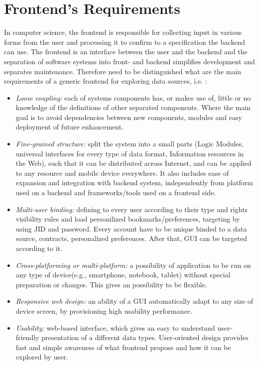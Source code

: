 \section {Frontend's Requirements}
	In computer science, the frontend is responsible for collecting input in various forms from the user and processing it to confirm to a specification the backend can use. The frontend is an interface between the user and the backend\cite{wiki:xxx} and the separation of software systems into front- and backend simplifies development and separates maintenance. Therefore need to be distinguished what are the main requirements of a generic frontend for exploring data sources, i.e. :
\begin{itemize}

\item \emph{Loose coupling:} each of systems components has, or makes use of, little or no knowledge of the definitions of other separated components. Where the main goal is to avoid dependencies between new components, modules and easy deployment of future enhancement.
\item \emph{Fine-grained structure:} split the system into a small parts (Logic Modules, universal interfaces for every type of data format, Information resources in the Web), such that it can be distributed across Internet, and can be applied to any resource and mobile device everywhere. It also includes ease of expansion and integration with backend system, independently from platform used on a backend and frameworks/tools used on a frontend side.
\item \emph{Multi-user binding:} defining to every user according to their type and rights visibility rules and load personilized bookmarks/preferences, targeting by using JID and password. Every account have to be unique binded to a data source, contracts, personalized preferences. After that, GUI can be targeted according to it.
\item \emph{Cross-platforming or multi-platform:} a possibility of application to be run on any type of device(e.g., smartphone, notebook, tablet) without special preparation or changes. This gives an possibility to be flexible.
\item \emph{Responsive web design:} an ability of a GUI automatically adapt to any size of device screen, by provisioning high usability performance.
\item \emph{Usability:} web-based interface, which gives an easy to understand user-friendly presentation of a different data types. User-oriented design provides fast and simple awareness of what frontend propose and how it can be explored by user.
\end{itemize} 

